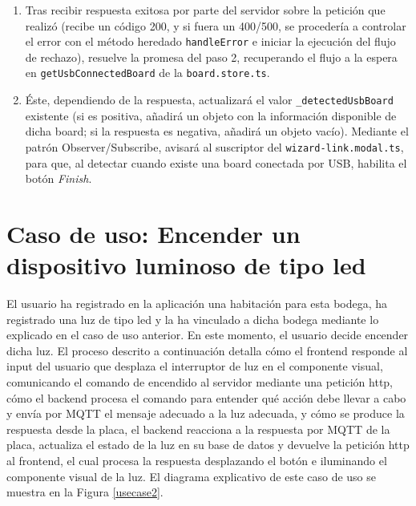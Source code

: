 \begin{enumerate}
\item  Tras recibir respuesta exitosa por parte del servidor sobre la petición que realizó (recibe un código 200, y si fuera un 400/500, se procedería a controlar el error con el método heredado \verb|handleError| e iniciar la ejecución del flujo de rechazo), resuelve la promesa del paso 2, recuperando el flujo a la espera en \verb|getUsbConnectedBoard| de la \verb|board.store.ts|.

\item  Éste, dependiendo de la respuesta, actualizará el valor \verb|_detectedUsbBoard| existente (si es positiva, añadirá un objeto con la información disponible de dicha board; si la respuesta es negativa, añadirá un objeto vacío). Mediante el patrón Observer/Subscribe, avisará al suscriptor del \verb|wizard-link.modal.ts|, para que, al detectar cuando existe una board conectada por USB, habilita el botón \textit{Finish}.
\end{enumerate}

\section{Caso de uso: Encender un dispositivo luminoso de tipo led}
\label{ch:Capitulo5.3}
El usuario ha registrado en la aplicación una habitación para esta bodega, ha registrado una luz de tipo led y la ha vinculado a dicha bodega mediante lo explicado en el caso de uso anterior. En este momento, el usuario decide encender dicha luz. El proceso descrito a continuación detalla cómo el frontend responde al input del usuario que desplaza el interruptor de luz en el componente visual, comunicando el comando de encendido al servidor mediante una petición http, cómo el backend procesa el comando para entender qué acción debe llevar a cabo y envía por MQTT el mensaje adecuado a la luz adecuada, y cómo se produce la respuesta desde la placa, el backend reacciona a la respuesta por MQTT de la placa, actualiza el estado de la luz en su base de datos y devuelve la petición http al frontend, el cual procesa la respuesta desplazando el botón e iluminando el componente visual de la luz.
El diagrama explicativo de este caso de uso se muestra en la Figura \ref{usecase2}.

